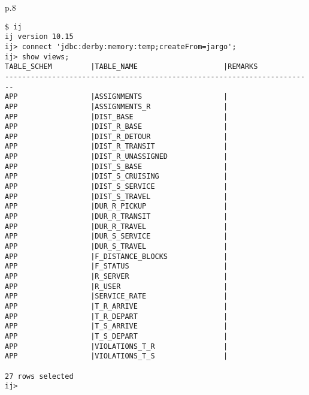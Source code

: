 \begin{tabular}{p{}}
\begin{verbatim}
$ ij
ij version 10.15
ij> connect 'jdbc:derby:memory:temp;createFrom=jargo';
ij> show views;
TABLE_SCHEM         |TABLE_NAME                    |REMARKS
------------------------------------------------------------------------
APP                 |ASSIGNMENTS                   |
APP                 |ASSIGNMENTS_R                 |
APP                 |DIST_BASE                     |
APP                 |DIST_R_BASE                   |
APP                 |DIST_R_DETOUR                 |
APP                 |DIST_R_TRANSIT                |
APP                 |DIST_R_UNASSIGNED             |
APP                 |DIST_S_BASE                   |
APP                 |DIST_S_CRUISING               |
APP                 |DIST_S_SERVICE                |
APP                 |DIST_S_TRAVEL                 |
APP                 |DUR_R_PICKUP                  |
APP                 |DUR_R_TRANSIT                 |
APP                 |DUR_R_TRAVEL                  |
APP                 |DUR_S_SERVICE                 |
APP                 |DUR_S_TRAVEL                  |
APP                 |F_DISTANCE_BLOCKS             |
APP                 |F_STATUS                      |
APP                 |R_SERVER                      |
APP                 |R_USER                        |
APP                 |SERVICE_RATE                  |
APP                 |T_R_ARRIVE                    |
APP                 |T_R_DEPART                    |
APP                 |T_S_ARRIVE                    |
APP                 |T_S_DEPART                    |
APP                 |VIOLATIONS_T_R                |
APP                 |VIOLATIONS_T_S                |

27 rows selected
ij>
\end{verbatim}\\
\end{tabular}
